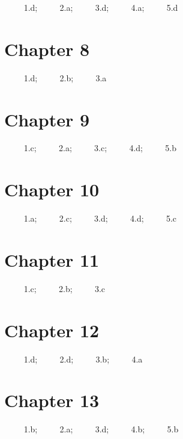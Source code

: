 \documentclass[
]{book}
\begin{document}
\(\qquad\) 1.d; \(\qquad\) 2.a; \(\qquad\) 3.d; \(\qquad\) 4.a; \(\qquad\) 5.d

\hypertarget{chapter-8}{%
\section{Chapter 8}\label{chapter-8}}

\(\qquad\) 1.d; \(\qquad\) 2.b; \(\qquad\) 3.a

\hypertarget{chapter-9}{%
\section{Chapter 9}\label{chapter-9}}

\(\qquad\) 1.c; \(\qquad\) 2.a; \(\qquad\) 3.c; \(\qquad\) 4.d; \(\qquad\) 5.b

\hypertarget{chapter-10}{%
\section{Chapter 10}\label{chapter-10}}

\(\qquad\) 1.a; \(\qquad\) 2.c; \(\qquad\) 3.d; \(\qquad\) 4.d; \(\qquad\) 5.c

\hypertarget{chapter-11}{%
\section{Chapter 11}\label{chapter-11}}

\(\qquad\) 1.c; \(\qquad\) 2.b; \(\qquad\) 3.c

\hypertarget{chapter-12}{%
\section{Chapter 12}\label{chapter-12}}

\(\qquad\) 1.d; \(\qquad\) 2.d; \(\qquad\) 3.b; \(\qquad\) 4.a

\hypertarget{chapter-13}{%
\section{Chapter 13}\label{chapter-13}}

\(\qquad\) 1.b; \(\qquad\) 2.a; \(\qquad\) 3.d; \(\qquad\) 4.b; \(\qquad\) 5.b

  
\end{document}
